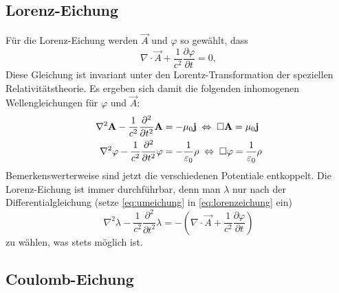 \subsection{Lorenz-Eichung}

Für die Lorenz-Eichung werden $\vec {A}$ und $\varphi $ so gewählt, dass
\begin{equation}
	\label{eq:lorenzeichung}
	\nabla \cdot \vec {A}+\frac{1}{c^{2}}\frac{\partial \varphi }{\partial t}=0,
\end{equation}
Diese Gleichung ist invariant unter den Lorentz-Transformation der speziellen Relativitätstheorie. Es ergeben sich damit die folgenden inhomogenen Wellengleichungen für $\varphi $ und $\vec {A}$:
\begin{align*}
	\nabla ^{2}\mathbf{A}-\frac{1}{c^{2}}\frac{\partial ^{2}}{\partial t^{2}}\mathbf{A} & =-\mu _{0}\mathbf{j}\;\Leftrightarrow\; \Box \mathbf{A}=\mu _{0}\mathbf{j}                              \\
	\nabla ^{2}\varphi -\frac{1}{c^{2}}\frac{\partial ^{2}}{\partial t^{2}}\varphi  & =-\frac{1}{\varepsilon _{0}}\rho \;\Leftrightarrow\; \Box \varphi =\frac{1}{\varepsilon _{0}}\rho
\end{align*}
Bemerkenswerterweise sind jetzt die verschiedenen Potentiale entkoppelt. Die Lorenz-Eichung ist immer durchführbar, denn man $\lambda $ nur nach der Differentialgleichung (setze \eqref{eq:umeichung} in \eqref{eq:lorenzeichung} ein)
\begin{equation*}
	\nabla ^{2}\lambda -\frac{1}{c^{2}}\frac{\partial ^{2}}{\partial t^{2}}\lambda =-\left(\nabla \cdot \vec {A}+\frac{1}{c^{2}}\frac{\partial \varphi }{\partial t}\right)
\end{equation*}
zu wählen, was stets möglich ist.


\subsection{Coulomb-Eichung}

